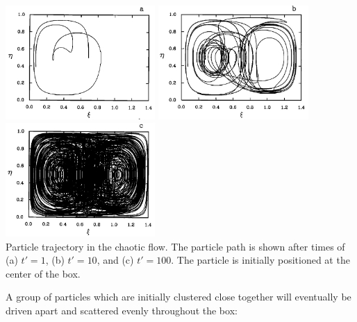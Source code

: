 \begin{center}
\includegraphics[width=5.7cm]{python_codes/fieldstone_156/images/ketu90b}
\includegraphics[width=5.7cm]{python_codes/fieldstone_156/images/ketu90c}
\includegraphics[width=5.7cm]{python_codes/fieldstone_156/images/ketu90d}\\
{\captionfont 
Particle trajectory in the chaotic flow. The particle 
path is shown after times of (a) $t'=1$, (b) $t'=10$, 
and (c) $t'=100$. The particle is initially positioned
at the center of the box.
}
\end{center}


A group of particles
which are initially clustered close together will eventually 
be driven apart and scattered evenly throughout the box:

